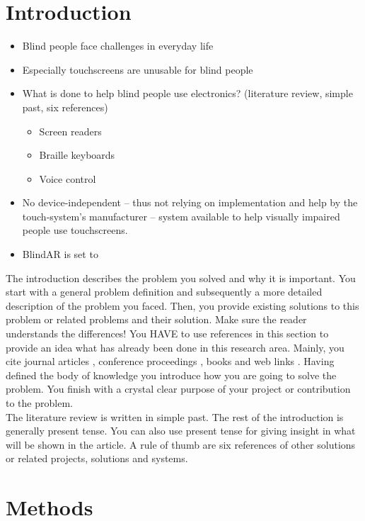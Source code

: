 \section{Introduction}

\begin{itemize}
	\item
		Blind people face challenges in everyday life
	\item
		Especially touchscreens are unusable for blind people
	\item
		What is done to help blind people use electronics? (literature review, simple past, six references)
		\begin{itemize}
			\item
				Screen readers
			\item
				Braille keyboards
			\item
				Voice control
		\end{itemize}
	\item
		No device-independent --  thus not relying on implementation and help by the touch-system's manufacturer -- system available to help visually impaired people use touchscreens.
	\item
		BlindAR is set to 
\end{itemize}

The introduction describes the problem you solved and why it is important. You start with a general problem definition and subsequently a more detailed description of the problem you faced. Then, you provide existing solutions to this problem or related problems and their solution. Make sure the reader understands the differences! You HAVE to use references in this section to provide an idea what has already been done in this research area. Mainly, you cite journal articles \cite{JournalArticle}, conference proceedings \cite{ProceedingsArticle}, books \cite{Book} and web links \cite{Weblink}. Having defined the body of knowledge you introduce how you are going to solve the problem. You finish with a crystal clear purpose of your project or contribution to the problem.\\
The literature review is written in simple past. The rest of the introduction is generally present tense. You can also use present tense for giving insight in what will be shown in the article. A rule of thumb are six references of other solutions or related projects, solutions and systems.  

\section{Methods}
